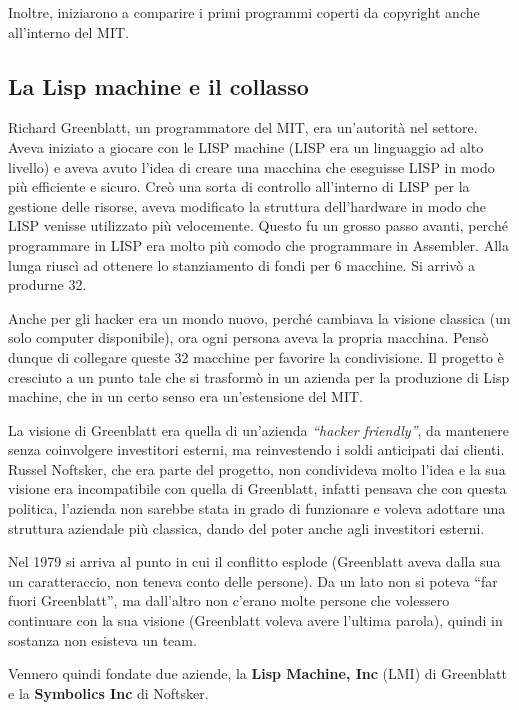 Inoltre, iniziarono a comparire i primi programmi coperti da copyright anche all'interno del MIT.

\subsection{La Lisp machine e il collasso}

Richard Greenblatt, un programmatore del MIT, era un'autorità nel settore. 
Aveva iniziato a giocare con le LISP machine (LISP era un linguaggio ad alto livello) e aveva avuto l'idea di creare una macchina che eseguisse LISP in modo più efficiente e sicuro. 
Creò una sorta di controllo all'interno di LISP per la gestione delle risorse, aveva modificato la struttura dell'hardware in modo che LISP venisse utilizzato più velocemente. 
Questo fu un grosso passo avanti, perché programmare in LISP era molto più comodo che programmare in Assembler. 
Alla lunga riuscì ad ottenere lo stanziamento di fondi per 6 macchine. Si arrivò a produrne 32. 

Anche per gli hacker era un mondo nuovo, perché cambiava la visione classica (un solo computer disponibile), ora ogni persona aveva la propria macchina. Pensò dunque di collegare queste 32 macchine per favorire la condivisione. 
Il progetto è cresciuto a un punto tale che si trasformò in un azienda per la produzione di Lisp machine, che in un certo senso era un'estensione del MIT. 

La visione di Greenblatt era quella di un'azienda \textit{``hacker friendly''}, da mantenere senza coinvolgere investitori esterni, ma reinvestendo i soldi anticipati dai clienti. 
Russel Noftsker, che era parte del progetto, non condivideva molto l'idea e la sua visione era incompatibile con quella di Greenblatt, infatti pensava che con questa politica, l'azienda non sarebbe stata in grado di funzionare e voleva adottare una struttura aziendale più classica, dando del poter anche agli investitori esterni.

Nel 1979 si arriva al punto in cui il conflitto esplode (Greenblatt aveva dalla sua un caratteraccio, non teneva conto delle persone). Da un lato non si poteva ``far fuori Greenblatt'', ma dall'altro non c'erano molte persone che volessero continuare con la sua visione (Greenblatt voleva avere l'ultima parola), quindi in sostanza non esisteva un team. 
 
 Vennero quindi fondate due aziende, la \textbf{Lisp Machine, Inc} (LMI) di Greenblatt e la \textbf{Symbolics Inc} di Noftsker.
 
